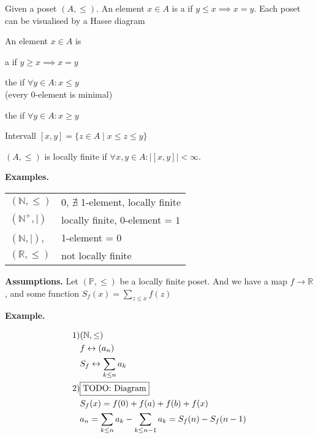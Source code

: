 \begin{definition}
Given a poset $(A, \leq)$.
An element $x \in A$ is a  if $y \leq x \implies x=y$.
Each poset can be visualised by a Hasse diagram


An element $x \in A$ is
\begin{compactitem}
  \item a  if $y \geq x \implies x=y$
  \item the  if $\forall y \in A : x \leq y$ \\
    (every 0-element is minimal)
  \item the  if $\forall y \in A : x \geq y$
\end{compactitem}

Intervall $[x,y] = \{z \in A \mid x \leq z \leq y\}$

$(A, \leq)$ is locally finite if $\forall x,y \in A: | [x,y]| < \infty$.
\end{definition}

\textbf{Examples.} \\
\begin{tabular}{ll}
  $(\mathbb{N}, \leq)$
    & 0, $\nexists$ 1-element, locally finite \\
  $(\mathbb{N}^{+}, \mid)$
    & locally finite, 0-element = $1$ \\
  $(\mathbb{N}, \mid)$,
    & 1-element = $0$ \\
  $(\mathbb{R}, \leq)$
    & not locally finite
\end{tabular}

\textbf{Assumptions.}
Let $(\mathbb{P}, \leq)$ be a locally finite poset. And we have a map $f \rightarrow \mathbb{R}$, and some function $S_f(x) = \sum_{z \leq x} f(z)$

\textbf{Example.}

\begin{align*}
  \text{1)}
    & (\mathbb{N}, \leq) \\
    & f \leftrightarrow (a_n) \\
    & S_f \leftrightarrow \sum_{k\leq n} a_k \\
  \text{2)} & \fbox{TODO: Diagram} \\
    & S_f(x) = f(0) + f(a) + f(b) + f(x) \\
    & a_n = \sum_{k \leq n} a_k - \sum_{k \leq n-1} a_k = S_f(n) - S_f(n-1)
\end{align*}


